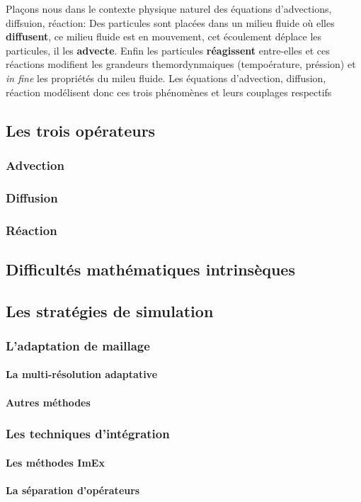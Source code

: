 Plaçons nous dans le contexte physique naturel des équations d'advections, diffsuion, réaction: 
Des particules sont placées dans un milieu fluide où elles \textbf{diffusent}, ce milieu fluide 
est en mouvement, cet écoulement déplace les particules, il les \textbf{advecte}.
Enfin les particules \textbf{réagissent} entre-elles et ces réactions modifient les grandeurs themordynmaiques (tempoérature, préssion) et \textit{in fine} les propriétés
du mileu fluide.
Les équations d'advection, diffusion, réaction modélisent donc ces trois phénomènes et leurs couplages respectifs
\subsection{Les trois opérateurs}
    \subsubsection{Advection}
    \subsubsection{Diffusion}
    \subsubsection{Réaction}
\subsection{Difficultés mathématiques intrinsèques}

\subsection{Les stratégies de simulation}
    \subsubsection{L'adaptation de maillage}
        \paragraph{La multi-résolution adaptative}
        \paragraph{Autres méthodes}
    \subsubsection{Les techniques d'intégration}
        \paragraph{Les méthodes ImEx}
        \paragraph{La séparation d'opérateurs}